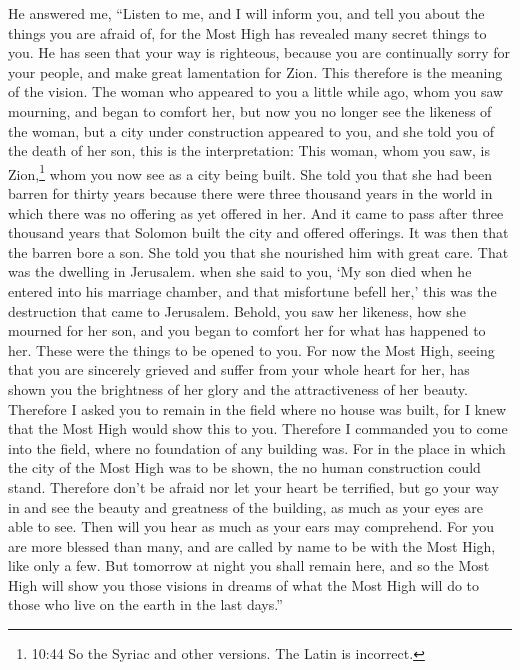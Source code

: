  He answered me, ``Listen to me, and I will inform you, and
tell you about the things you are afraid of, for the Most High has
revealed many secret things to you.  He has seen that your
way is righteous, because you are continually sorry for your people, and
make great lamentation for Zion.  This therefore is the
meaning of the vision.  The woman who appeared to you a
little while ago, whom you saw mourning, and began to comfort her,
 but now you no longer see the likeness of the woman, but a
city under construction appeared to you,  and she told you
of the death of her son, this is the interpretation:  This
woman, whom you saw, is Zion,\footnote{10:44 So the Syriac and other
  versions. The Latin is incorrect.} whom you now see as a city being
built.  She told you that she had been barren for thirty
years because there were three thousand years in the world in which
there was no offering as yet offered in her.  And it came
to pass after three thousand years that Solomon built the city and
offered offerings. It was then that the barren bore a son. 
She told you that she nourished him with great care. That was the
dwelling in Jerusalem.  when she said to you, `My son died
when he entered into his marriage chamber, and that misfortune befell
her,' this was the destruction that came to Jerusalem. 
Behold, you saw her likeness, how she mourned for her son, and you began
to comfort her for what has happened to her. These were the things to be
opened to you.  For now the Most High, seeing that you are
sincerely grieved and suffer from your whole heart for her, has shown
you the brightness of her glory and the attractiveness of her beauty.
 Therefore I asked you to remain in the field where no
house was built,  for I knew that the Most High would show
this to you.  Therefore I commanded you to come into the
field, where no foundation of any building was.  For in the
place in which the city of the Most High was to be shown, the no human
construction could stand.  Therefore don't be afraid nor
let your heart be terrified, but go your way in and see the beauty and
greatness of the building, as much as your eyes are able to see.
 Then will you hear as much as your ears may comprehend.
 For you are more blessed than many, and are called by name
to be with the Most High, like only a few.  But tomorrow at
night you shall remain here,  and so the Most High will
show you those visions in dreams of what the Most High will do to those
who live on the earth in the last days.''


